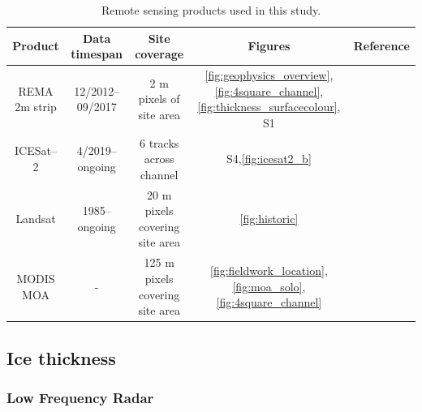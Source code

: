 \begin{table}
\centering
\begin{tabular}{ |c|c c c c| } 
 \hline
 Product & Data timespan & Site coverage & Figures & Reference \\ 
 \hline
 REMA 2m strip &  12/2012--09/2017 & 2 m pixels of site area & \ref{fig:geophysics_overview},\ref{fig:4square_channel},\ref{fig:thickness_surfacecolour}, S1
 \\ 
 ICESat--2 &  4/2019--ongoing &  6 tracks across channel & S4,\ref{fig:icesat2_b} 
 \\
 Landsat &  1985--ongoing & 20 m pixels covering site area & \ref{fig:historic} 
\\ 
 MODIS MOA & - & 125 m pixels covering site area & \ref{fig:fieldwork_location},\ref{fig:moa_solo},\ref{fig:4square_channel}
\\
 \hline
\end{tabular}
\label{tab:remote_table}
\caption{Remote sensing products used in this study.}
\end{table}


\subsection{Ice thickness} \label{sec:icethickness}

\subsubsection{Low Frequency Radar} \label{sec:radar}



